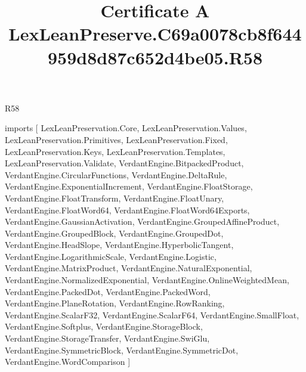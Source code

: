 \begin{lexlean}{R58}
\title{Certificate A LexLeanPreserve.C69a0078cb8f644959d8d87c652d4be05.R58}
\begin{coremodule}
imports [
  LexLeanPreservation.Core,
  LexLeanPreservation.Values,
  LexLeanPreservation.Primitives,
  LexLeanPreservation.Fixed,
  LexLeanPreservation.Keys,
  LexLeanPreservation.Templates,
  LexLeanPreservation.Validate,
  VerdantEngine.BitpackedProduct,
  VerdantEngine.CircularFunctions,
  VerdantEngine.DeltaRule,
  VerdantEngine.ExponentialIncrement,
  VerdantEngine.FloatStorage,
  VerdantEngine.FloatTransform,
  VerdantEngine.FloatUnary,
  VerdantEngine.FloatWord64,
  VerdantEngine.FloatWord64Exports,
  VerdantEngine.GaussianActivation,
  VerdantEngine.GroupedAffineProduct,
  VerdantEngine.GroupedBlock,
  VerdantEngine.GroupedDot,
  VerdantEngine.HeadSlope,
  VerdantEngine.HyperbolicTangent,
  VerdantEngine.LogarithmicScale,
  VerdantEngine.Logistic,
  VerdantEngine.MatrixProduct,
  VerdantEngine.NaturalExponential,
  VerdantEngine.NormalizedExponential,
  VerdantEngine.OnlineWeightedMean,
  VerdantEngine.PackedDot,
  VerdantEngine.PackedWord,
  VerdantEngine.PlaneRotation,
  VerdantEngine.RowRanking,
  VerdantEngine.ScalarF32,
  VerdantEngine.ScalarF64,
  VerdantEngine.SmallFloat,
  VerdantEngine.Softplus,
  VerdantEngine.StorageBlock,
  VerdantEngine.StorageTransfer,
  VerdantEngine.SwiGlu,
  VerdantEngine.SymmetricBlock,
  VerdantEngine.SymmetricDot,
  VerdantEngine.WordComparison
]


\end{coremodule}
\end{lexlean}
